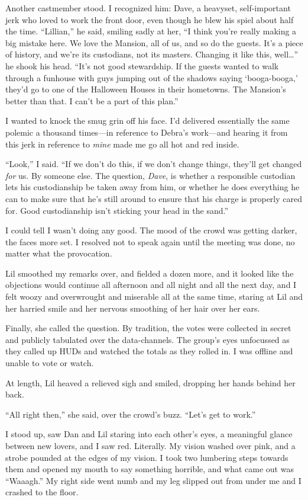 Another castmember stood. I recognized him: Dave, a heavyset,
self-important jerk who loved to work the front door, even though
he blew his spiel about half the time. “Lillian,” he said, smiling
sadly at her, “I think you're really making a big mistake here. We
love the Mansion, all of us, and so do the guests. It's a piece of
history, and we're its custodians, not its masters. Changing it
like this, well…” he shook his head. “It's not good stewardship. If
the guests wanted to walk through a funhouse with guys jumping out
of the shadows saying ‘booga-booga,’ they'd go to one of the
Halloween Houses in their hometowns. The Mansion's better than
that. I can't be a part of this plan.”

I wanted to knock the smug grin off his face. I'd delivered
essentially the same polemic a thousand times—in reference to
Debra's work—and hearing it from this jerk in reference to
\emph{mine} made me go all hot and red inside.

“Look,” I said. “If we don't do this, if we don't change things,
they'll get changed \emph{for} us. By someone else. The question,
\emph{Dave}, is whether a responsible custodian lets his
custodianship be taken away from him, or whether he does everything
he can to make sure that he's still around to ensure that his
charge is properly cared for. Good custodianship isn't sticking
your head in the sand.”

I could tell I wasn't doing any good. The mood of the crowd was
getting darker, the faces more set. I resolved not to speak again
until the meeting was done, no matter what the provocation.

Lil smoothed my remarks over, and fielded a dozen more, and it
looked like the objections would continue all afternoon and all
night and all the next day, and I felt woozy and overwrought and
miserable all at the same time, staring at Lil and her harried
smile and her nervous smoothing of her hair over her ears.

Finally, she called the question. By tradition, the votes were
collected in secret and publicly tabulated over the data-channels.
The group's eyes unfocussed as they called up HUDs and watched the
totals as they rolled in. I was offline and unable to vote or
watch.

At length, Lil heaved a relieved sigh and smiled, dropping her
hands behind her back.

“All right then,” she said, over the crowd's buzz. “Let's get to
work.”

I stood up, saw Dan and Lil staring into each other's eyes, a
meaningful glance between new lovers, and I saw red. Literally. My
vision washed over pink, and a strobe pounded at the edges of my
vision. I took two lumbering steps towards them and opened my mouth
to say something horrible, and what came out was “Waaagh.” My right
side went numb and my leg slipped out from under me and I crashed
to the floor.

